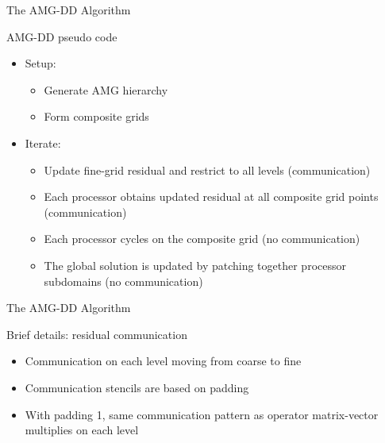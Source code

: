 \documentclass[18pt,xcolor=table]{beamer}
\begin{document}
\begin{frame}{The AMG-DD Algorithm}
\begin{block}{AMG-DD pseudo code}
\begin{itemize}
\item Setup:
\begin{itemize}
\item Generate AMG hierarchy
\item Form composite grids
\end{itemize}
\item Iterate:
\begin{itemize}
\item Update fine-grid residual and restrict to all levels (communication)
\item Each processor obtains updated residual at all composite grid points (communication)
\item Each processor cycles on the composite grid (no communication)
\item The global solution is updated by patching together processor subdomains (no communication)
\end{itemize}
\end{itemize}
\end{block}

\end{frame}

%
%
%
%

\begin{frame}{The AMG-DD Algorithm}
\begin{block}{Brief details: residual communication}
\begin{itemize}
\item Communication on each level moving from coarse to fine
\item Communication stencils are based on padding
\item With padding 1, same communication pattern as operator matrix-vector multiplies on each level 
\end{itemize}
\end{block}

\end{frame}
\end{document}
